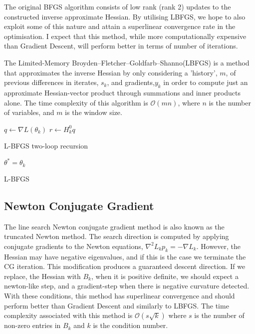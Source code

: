 \documentclass{article}
\begin{document}
The original BFGS algorithm consists of low rank (rank 2) updates to the constructed inverse approximate Hessian. By utilising LBFGS, we hope to also exploit some of this nature and attain a superlinear convergence rate in the optimisation. I expect that this method, while more computationally expensive than Gradient Descent, will perform better in terms of number of iterations.

The Limited-Memory Broyden–Fletcher–Goldfarb–Shanno(LBFGS) is a method that approximates the inverse Hessian by only considering a 'history', $m$, of previous differences in iterates, $s_k$, and gradients,$y_k$ in order to compute just an approximate Hessian-vector product through summations and inner products alone. The time complexity of this algorithm is $\mathcal{O}(mn)$, where $n$ is the number of variables, and $m$ is the window size.



\begin{algorithm}[H]
\SetAlgoLined
{} 
 $q \gets \nabla L(\theta_k)$\;
 $r \gets H_k^0 q$\;
 \caption{L-BFGS two-loop recursion}
\end{algorithm}

\begin{algorithm}[H]
\SetAlgoLined
\KwResult{$\theta^{*}$ } 
 $\theta^* = \theta_k$\;
 \caption{L-BFGS}
\end{algorithm}

\subsection{Newton Conjugate Gradient}

The line search Newton conjugate gradient method is also known as the truncated Newton method. The search direction is computed by applying conjugate gradients to the Newton equations, $\nabla^2 L_k p_k = -\nabla L_k$. However, the Hessian may have negative eigenvalues, and if this is the case we terminate the CG iteration. This modification produces a guaranteed descent direction. If we replace, the Hessian with $B_k$, when it is positive definite, we should expect a newton-like step, and a gradient-step when there is negative curvature detected. With these conditions, this method has superlinear convergence and should perform better than Gradient Descent and similarly to LBFGS. The time complexity associated with this method is $\mathcal{O}(s\sqrt{k})$ where $s$ is the number of non-zero entries in $B_k$ and $k$ is the condition number.
\end{document}
